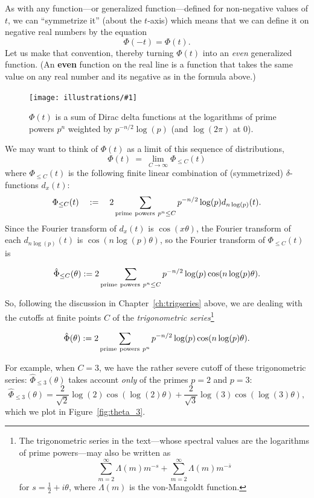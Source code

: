 \documentclass[openany]{book}
\newcommand{\ill}[3]{%
   \begin{figure}[H]%
   \vspace{-2ex}
   \centering%
   \texttt{[image: illustrations/\#1]}%
   \caption{#3}%
   \vspace{-2ex}
    \end{figure}}
\theoremstyle{plain}
\theoremstyle{definition}
\begin{document}
{{As with any function---or generalized function---defined for
non-negative values of $t$, we can ``symmetrize it'' (about the
$t$-axis) which means that we can define it on negative real numbers
by the equation
  $$\Phi(-t) = \Phi(t).$$
  Let us make that convention, thereby turning $\Phi(t)$ into an {\it
    even} generalized function. (An {\bf even} function on the real line is a function that takes the same value on any real number and its negative as in the formula above.)

\ill{bigPhi}{1}{$\Phi(t)$ is a sum of Dirac delta functions at the logarithms of prime powers $p^n$ weighted by $p^{-n/2}\log(p)$ (and $\log(2\pi)$ at $0$).}


We may want to think of $\Phi(t)$ as a limit of this sequence of distributions,
 $$\Phi(t)\ = \ \lim_{C \to {\infty}}\Phi_{\le C}(t)$$
where $\Phi_{\le C}(t)$  is the following finite linear
combination of (symmetrized) $\delta$-functions  $d_x(t)$:
 $$\Phi_{\le C}(t)\quad :=\quad  2\sum_{{\rm prime\ powers \ }p^n  \le C} p^{-n/2}\log(p)d_{n\log(p)}(t).$$
 Since the Fourier transform of $d_x(t)$ is  $\cos(x\theta)$, the Fourier transform of  each $d_{n\log(p)}(t)$ is
 $\cos(n\log(p)\theta)$, so the Fourier transform of $\Phi_{\le
   C}(t)$ is

  $${\hat \Phi}_{\leq C}(\theta):= 2\sum_{{\rm prime\ powers\ }p^n  \leq{} C} p^{-n/2} \log(p)\cos(n\log(p)\theta).$$

   So, following the discussion in Chapter~\ref{ch:trigseries} above, we are dealing with the cutoffs at finite points  $C$  of the {\it trigonometric series}{\footnote{The trigonometric series in the text---whose spectral values are the logarithms of prime powers---may also be written as
   $$\sum_{m=2}^{\infty}\Lambda(m)m^{-s} + \sum_{m=2}^{\infty}\Lambda(m)m^{-{\bar s}}$$ for $s={\frac{1}{2}}+i\theta$, where  $\Lambda(m)$ is the von-Mangoldt function.}}

   $${\hat \Phi}(\theta):= 2\sum_{{\rm prime\ powers\ }p^n } p^{-n/2} \log(p)\cos(n\log(p)\theta).$$




For example, when $C=3$, we have the rather severe cutoff of these trigonometric series: ${\hat \Phi}_{\leq 3}(\theta)$ takes account {\it only} of the primes $p=2$ and $p=3$:
$$
  {\hat \Phi}_{\leq 3}(\theta) =
  \frac{2}{\sqrt{2}} \log(2)\cos(\log(2)\theta)
 +
 \frac{2}{\sqrt{3}} \log(3)\cos(\log(3)\theta),
$$
which we plot in Figure~\ref{fig:theta_3}.


}}
\end{document}
